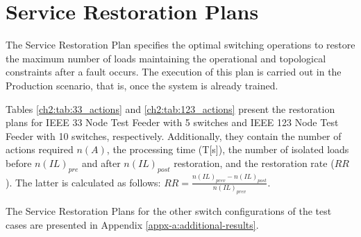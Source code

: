 \section{Service Restoration Plans}

The Service Restoration Plan specifies the optimal switching operations to restore the maximum number of loads
maintaining the operational and topological constraints after a fault occurs. 
The execution of this plan is carried out in the Production scenario, that is, once the system is already trained.

Tables \ref{ch2:tab:33_actions} and \ref{ch2:tab:123_actions} present the restoration plans for IEEE 33 Node Test Feeder with 5 switches 
and IEEE 123 Node Test Feeder with 10 switches, respectively. Additionally, they contain the number of actions required $n(A)$, 
the processing time (T[s]), the number of isolated loads before $n(IL)_{pre}$ and after $n(IL)_{post}$  restoration, and the restoration rate ($RR$).
The latter is calculated as follows: $ RR = \frac{n(IL)_{prev}-n(IL)_{post}}{n(IL)_{prev}}$.

The Service Restoration Plans for the other switch configurations of the test cases are presented in Appendix \ref{appx-a:additional-results}.

